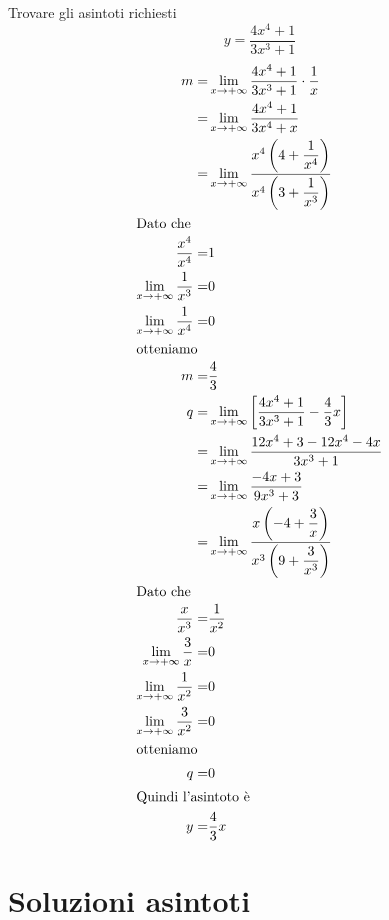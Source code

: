 \begin{exercise}
	Trovare gli asintoti richiesti
	\[y=\dfrac{4x^4+1}{3x^3+1}\]
	\tcblower
	\begin{align*}
	m=&\lim_{x\to +\infty}\dfrac{4x^4+1}{3x^3+1}\cdot\dfrac{1}{x}\\
	=&\lim_{x\to +\infty}\dfrac{4x^4+1}{3x^4+x}\\
	=&\lim_{x\to +\infty}\dfrac{x^4\left(4+\dfrac{1}{x^4}\right)}{x^4\left(3+\dfrac{1}{x^3}\right)}\\
	\intertext{Dato che}
	\dfrac{x^4}{x^4}=&1\\
	\lim_{x\to +\infty}\dfrac{1}{x^3}=&0\\
	\lim_{x\to +\infty}\dfrac{1}{x^4}=&0\\
	\intertext{otteniamo}
	m=&\dfrac{4}{3}\\
	q=&\lim_{x\to +\infty}\left[\dfrac{4x^4+1}{3x^3+1}-\dfrac{4}{3}x\right]\\
	=&\lim_{x\to +\infty}\dfrac{12x^4+3-12x^4-4x}{3x^3+1}\\
	=&\lim_{x\to +\infty}\dfrac{-4x+3}{9x^3+3}\\
	=&\lim_{x\to +\infty}\dfrac{x\left(-4+\dfrac{3}{x}\right)}{x^3\left(9+\dfrac{3}{x^3}\right)}\\
	\intertext{Dato che}
	\dfrac{x}{x^3}=&\dfrac{1}{x^2}\\
	\lim_{x\to +\infty}\dfrac{3}{x}=&0\\
	\lim_{x\to +\infty}\dfrac{1}{x^2}=&0\\
	\lim_{x\to +\infty}\dfrac{3}{x^2}=&0\\
	\intertext{otteniamo}
	q=&0\\
	\intertext{Quindi l'asintoto è}
	y=&\dfrac{4}{3}x
	\end{align*}
\end{exercise}
\tcbstoprecording
\newpage
\section{Soluzioni asintoti}
\tcbinputrecords
